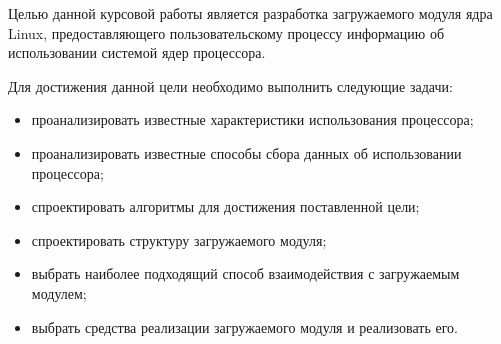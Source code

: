 
Целью данной курсовой работы является разработка загружаемого модуля ядра Linux, предоставляющего пользовательскому процессу информацию об использовании системой ядер процессора.

Для достижения данной цели необходимо выполнить следующие задачи:
\begin{itemize}
	\item проанализировать известные характеристики использования процессора;
	\item проанализировать известные способы сбора данных об использовании процессора;
	\item спроектировать алгоритмы для достижения поставленной цели;
	\item спроектировать структуру загружаемого модуля;
	\item выбрать наиболее подходящий способ взаимодействия с загружаемым модулем;
	\item выбрать средства реализации загружаемого модуля и реализовать его.
\end{itemize}